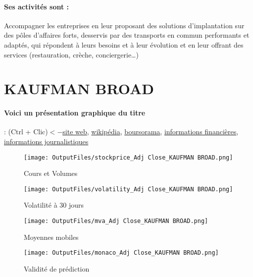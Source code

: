 \documentclass[11pt,a4paper]{report}%
\begin{document}
\paragraph{Ses activités sont : } Accompagner les entreprises en leur proposant des solutions d’implantation sur des pôles d’affaires forts, desservis par des transports en commun performants et adaptés, qui répondent à leurs besoins et à leur évolution et en leur offrant des services (restauration, crèche, conciergerie…) 
    
    \newpage

\section{KAUFMAN BROAD}

\paragraph{Voici un présentation graphique du titre} : (Ctrl + Clic)$<-$\href{https://www.kaufmanbroad.fr/finances/publications.html}{site web}, \href{https://fr.wikipedia.org/wiki/Kaufman_%26_Broad}{wikipédia}, \href{https://www.boursorama.com/cours/1rPKOF/}{boursorama}, \href{https://www.qwant.com/?q=site:https:%2f%2fwww.easybourse.com%2faction-societe%2fKAUFMAN-BROAD&t=web&client=ext-firefox-hp}{informations financières}, \href{https://bourse.lerevenu.com/cours-de-bourse/fiche-valeur-synthese/KAUFMAN-BROAD/KOF-FR}{informations journalistiques}
\begin{figure}[!htb]
   \begin{minipage}{0.5\textwidth}
     \centering
     \texttt{[image: OutputFiles/stockprice\_Adj Close\_KAUFMAN BROAD.png]}
     \caption{Cours et Volumes}\label{Fig:price_KAUFMAN BROAD}
   \end{minipage}\hfill
   \begin{minipage}{0.5\textwidth}
     \centering
     \texttt{[image: OutputFiles/volatility\_Adj Close\_KAUFMAN BROAD.png]}
     \caption{Volatilité à 30 jours}\label{Fig:volat_KAUFMAN BROAD}
   \end{minipage}
\end{figure}
\begin{figure}[!htb]
   \begin{minipage}{0.5\textwidth}
     \centering
     \texttt{[image: OutputFiles/mva\_Adj Close\_KAUFMAN BROAD.png]}
     \caption{Moyennes mobiles}\label{Fig:mva_KAUFMAN BROAD}
   \end{minipage}\hfill
   \begin{minipage}{0.5\textwidth}
     \centering
     \texttt{[image: OutputFiles/monaco\_Adj Close\_KAUFMAN BROAD.png]}
     \caption{Validité de prédiction}\label{Fig:prediction_KAUFMAN BROAD}
   \end{minipage}
\end{figure}
\end{document}
